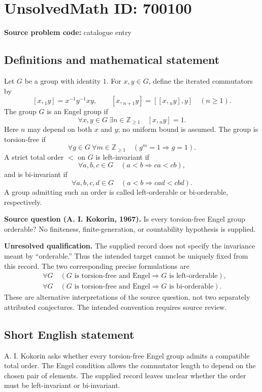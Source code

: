 \documentclass[11pt]{article}
\newcommand{\Z}{\mathbb{Z}}
\begin{document}
\section*{UnsolvedMath ID: 700100}
\textbf{Source problem code:} catalogue entry
\subsection{Definitions and mathematical statement}
Let \(G\) be a group with identity \(1\). For \(x,y\in G\), define the iterated commutators by
\[
[x,{}_1y]=x^{-1}y^{-1}xy,\qquad [x,{}_{n+1}y]=[[x,{}_ny],y]\quad(n\geq 1).
\]
The group \(G\) is an Engel group if
\[
\forall x,y\in G\ \exists n\in\Z_{\geq 1}\quad [x,{}_ny]=1.
\]
Here \(n\) may depend on both \(x\) and \(y\); no uniform bound is assumed. The group is torsion-free if
\[
\forall g\in G\ \forall m\in\Z_{\geq 1}\quad (g^m=1\Longrightarrow g=1).
\]
A strict total order \(<\) on \(G\) is left-invariant if
\[
\forall a,b,c\in G\quad (a<b\Longrightarrow ca<cb),
\]
and is bi-invariant if
\[
\forall a,b,c,d\in G\quad (a<b\Longrightarrow cad<cbd).
\]
A group admitting such an order is called left-orderable or bi-orderable, respectively.

\textbf{Source question (A. I. Kokorin, 1967).} Is every torsion-free Engel group orderable? No finiteness, finite-generation, or countability hypothesis is supplied.

\textbf{Unresolved qualification.} The supplied record does not specify the invariance meant by ``orderable.'' Thus the intended target cannot be uniquely fixed from this record. The two corresponding precise formulations are
\[
\begin{aligned}
&\forall G\quad (G\text{ is torsion-free and Engel}\Longrightarrow G\text{ is left-orderable}),\\
&\forall G\quad (G\text{ is torsion-free and Engel}\Longrightarrow G\text{ is bi-orderable}).
\end{aligned}
\]
These are alternative interpretations of the source question, not two separately attributed conjectures. The intended convention requires source review.
\subsection{Short English statement}
A. I. Kokorin asks whether every torsion-free Engel group admits a compatible total order. The Engel condition allows the commutator length to depend on the chosen pair of elements. The supplied record leaves unclear whether the order must be left-invariant or bi-invariant.
\end{document}
